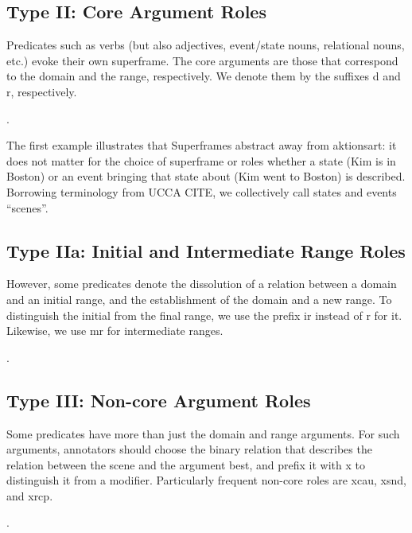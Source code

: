 \documentclass[a4paper]{article}
\begin{document}
\subsection{Type II: Core Argument Roles}

Predicates such as verbs (but also adjectives, event/state nouns, relational nouns, etc.) evoke their own superframe. The core arguments are those that correspond to the domain and the range, respectively. We denote them by the suffixes \textsf{d} and \textsf{r}, respectively.

\ex. 

The first example illustrates that Superframes abstract away from aktionsart: it does not matter for the choice of superframe or roles whether a state (Kim is in Boston) or an event bringing that state about (Kim went to Boston) is described. Borrowing terminology from UCCA CITE, we collectively call states and events ``scenes''.

\subsection{Type IIa: Initial and Intermediate Range Roles}

However, some predicates denote the dissolution of a relation between a domain and an initial range, and the establishment of the domain and a new range. To distinguish the initial from the final range, we use the prefix \textsf{ir} instead of \textsf{r} for it. Likewise, we use \textsf{mr} for intermediate ranges.

\ex. \\

\subsection{Type III: Non-core Argument Roles}

Some predicates have more than just the domain and range arguments. For such arguments, annotators should choose the binary relation that describes the relation between the scene and the argument best, and prefix it with \textsf{x} to distinguish it from a modifier. Particularly frequent non-core roles are \textsf{xcau}, \textsf{xsnd}, and \textsf{xrcp}.

\ex. 
     \\
\end{document}
